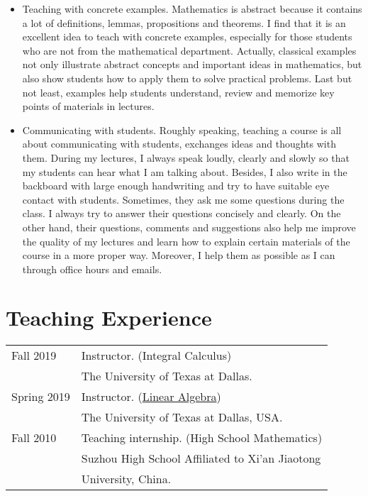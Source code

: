 \documentclass[10pt,a4paper]{article}
\begin{document}
\begin{itemize}
\item Teaching with concrete examples. 
Mathematics is abstract because it contains a lot of definitions, lemmas, propositions and theorems. 
I find that it is an excellent idea to teach with concrete examples, especially for those students who are not from 
the mathematical department. Actually, classical examples not only illustrate abstract concepts and important ideas in mathematics, 
but also show students how to apply them to solve practical problems. 
Last but not least, examples help students understand, review and memorize 
key points of materials in lectures.  

\item Communicating with students. Roughly speaking, teaching a course is all about communicating with students, 
exchanges ideas and thoughts with them. During my lectures, I always speak loudly, clearly and slowly so that my students 
can hear what I am talking about. Besides, I also write in the backboard with large enough handwriting and 
try to have suitable eye contact with students. Sometimes, they ask me some questions during the class. 
I always try to answer their questions concisely and clearly. On the other hand, their questions, comments and suggestions also help me 
improve the quality of my lectures and learn how to explain certain materials of the course in a more proper way. 
Moreover, I help them as possible as I can through office hours and emails.     
\end{itemize}

\section*{\Large{Teaching Experience}}
\begin{tabular}{@{}p{1.4in}p{4in}} 
Fall 2019 & Instructor. (Integral Calculus) \\
             & The University of Texas at Dallas.   \\
Spring 2019           & Instructor. (\href{https://yzhang1616.github.io/algebra19spring/algebra.html}{Linear Algebra}) \\
                      & The University of Texas at Dallas, USA. \\
Fall 2010             & Teaching internship. (High School Mathematics) \\
                      & Suzhou High School Affiliated to Xi'an Jiaotong \\
                      & University, China.   
                  
\end{tabular}
\end{document}
